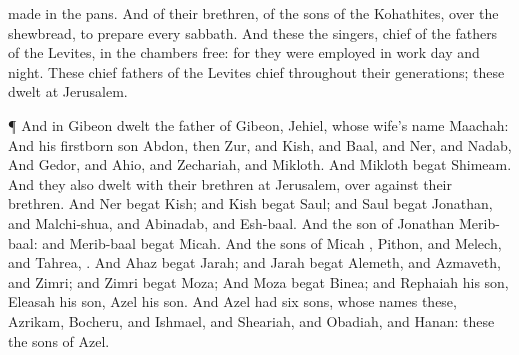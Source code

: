 {made in the
pans.
And
{} of their
brethren, of the
sons of the
Kohathites,
{} over the
shewbread, to
prepare
{} every
sabbath.
And these
{} the
singers,
chief of the
fathers of the
Levites,
{} in the
chambers
{}
free: for they were employed in
{}
work
day and
night.
These
chief
fathers of the
Levites
{}
chief throughout their
generations; these
dwelt at
Jerusalem.
\par }{\PP {}¶ And in
Gibeon
dwelt the
father of
Gibeon,
Jehiel, whose
wife’s
name
{}
Maachah:
And his
firstborn
son
Abdon, then
Zur, and
Kish, and
Baal, and
Ner, and
Nadab,
And
Gedor, and
Ahio, and
Zechariah, and
Mikloth.
And
Mikloth
begat
Shimeam. And they also
dwelt with their
brethren at
Jerusalem, over against their
brethren.
And
Ner
begat
Kish; and
Kish
begat
Saul; and
Saul
begat
Jonathan, and
Malchi-shua, and
Abinadab, and
Esh-baal.
And the
son of
Jonathan
{}
Merib-baal: and
Merib-baal
begat
Micah.
And the
sons of
Micah
{},
Pithon, and
Melech, and
Tahrea,
{}.
And
Ahaz
begat
Jarah; and
Jarah
begat
Alemeth, and
Azmaveth, and
Zimri; and
Zimri
begat
Moza;
And
Moza
begat
Binea; and
Rephaiah his
son,
Eleasah his
son,
Azel his
son.
And
Azel had
six
sons, whose
names
{} these,
Azrikam,
Bocheru, and
Ishmael, and
Sheariah, and
Obadiah, and
Hanan: these
{} the
sons of
Azel.

}
